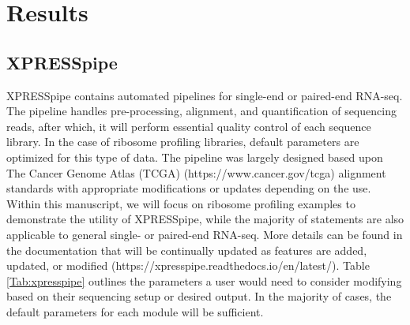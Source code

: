 \documentclass[10pt, oneside]{article}
\begin{document}
\section{Results}

\subsection{XPRESSpipe}
XPRESSpipe contains automated pipelines for single-end or paired-end RNA-seq. The pipeline handles pre-processing, alignment, and quantification of sequencing reads, after which, it will perform essential quality control of each sequence library. In the case of ribosome profiling libraries, default parameters are optimized for this type of data. The pipeline was largely designed based upon The Cancer Genome Atlas (TCGA) (https://www.cancer.gov/tcga) alignment standards with appropriate modifications or updates depending on the use. Within this manuscript, we will focus on ribosome profiling examples to demonstrate the utility of XPRESSpipe, while the majority of statements are also applicable to general single- or paired-end RNA-seq. More details can be found in the documentation that will be continually updated as features are added, updated, or modified (https://xpresspipe.readthedocs.io/en/latest/). Table \ref{Tab:xpresspipe} outlines the parameters a user would need to consider modifying based on their sequencing setup or desired output. In the majority of cases, the default parameters for each module will be sufficient. \newline
\end{document}
